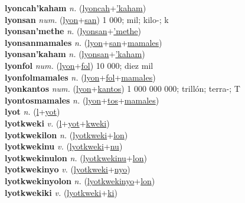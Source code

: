 \textbf{lyoncah'kaham} \textit{n.} (\hyperref[lyoncah]{lyoncah}+\hyperref['kaham]{'kaham})
 \label{lyoncah'kaham} \\
\textbf{lyonsan} \textit{num.} (\hyperref[lyon]{lyon}+\hyperref[san]{san})
1 000; mil; kilo-; k \label{lyonsan} \\
\textbf{lyonsan'methe} \textit{n.} (\hyperref[lyonsan]{lyonsan}+\hyperref['methe]{'methe})
 \label{lyonsan'methe} \\
\textbf{lyonsanmamales} \textit{n.} (\hyperref[lyon]{lyon}+\hyperref[san]{san}+\hyperref[mamales]{mamales})
 \label{lyonsanmamales} \\
\textbf{lyonsan'kaham} \textit{n.} (\hyperref[lyonsan]{lyonsan}+\hyperref['kaham]{'kaham})
 \label{lyonsan'kaham} \\
\textbf{lyonfol} \textit{num.} (\hyperref[lyon]{lyon}+\hyperref[fol]{fol})
10 000; diez mil \label{lyonfol} \\
\textbf{lyonfolmamales} \textit{n.} (\hyperref[lyon]{lyon}+\hyperref[fol]{fol}+\hyperref[mamales]{mamales})
 \label{lyonfolmamales} \\
\textbf{lyonkantos} \textit{num.} (\hyperref[lyon]{lyon}+\hyperref[kantos]{kantos})
1 000 000 000; trillón; terra-; T \label{lyonkantos} \\
\textbf{lyontosmamales} \textit{n.} (\hyperref[lyon]{lyon}+\hyperref[tos]{tos}+\hyperref[mamales]{mamales})
 \label{lyontosmamales} \\
\textbf{lyot} \textit{n.} (\hyperref[l]{l}+\hyperref[yot]{yot})
 \label{lyot} \\
\textbf{lyotkweki} \textit{v.} (\hyperref[l]{l}+\hyperref[yot]{yot}+\hyperref[kweki]{kweki})
 \label{lyotkweki} \\
\textbf{lyotkwekilon} \textit{n.} (\hyperref[lyotkweki]{lyotkweki}+\hyperref[lon]{lon})
 \label{lyotkwekilon} \\
\textbf{lyotkwekinu} \textit{v.} (\hyperref[lyotkweki]{lyotkweki}+\hyperref[nu]{nu})
 \label{lyotkwekinu} \\
\textbf{lyotkwekinulon} \textit{n.} (\hyperref[lyotkwekinu]{lyotkwekinu}+\hyperref[lon]{lon})
 \label{lyotkwekinulon} \\
\textbf{lyotkwekinyo} \textit{v.} (\hyperref[lyotkweki]{lyotkweki}+\hyperref[nyo]{nyo})
 \label{lyotkwekinyo} \\
\textbf{lyotkwekinyolon} \textit{n.} (\hyperref[lyotkwekinyo]{lyotkwekinyo}+\hyperref[lon]{lon})
 \label{lyotkwekinyolon} \\
\textbf{lyotkwekiki} \textit{v.} (\hyperref[lyotkweki]{lyotkweki}+\hyperref[ki]{ki})
